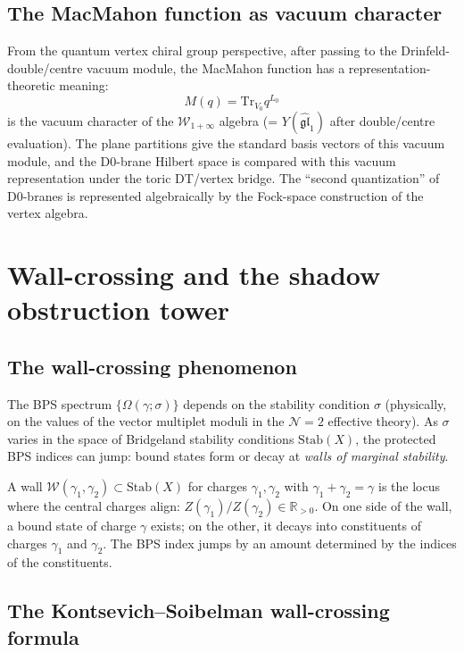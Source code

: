 \documentclass[11pt]{article}
\theoremstyle{definition}
\newcommand{\Tr}{\mathrm{Tr}}
\newcommand{\bR}{\mathbb{R}}
\begin{document}
\subsection{The MacMahon function as vacuum character}

From the quantum vertex chiral group perspective, after passing to the
Drinfeld-double/centre vacuum module, the MacMahon function has a
representation-theoretic meaning:
\[
 M(q) = \Tr_{V_0} q^{L_0}
\]
is the vacuum character of the $\mathcal{W}_{1+\infty}$ algebra (=
$Y(\widehat{\mathfrak{gl}}_1)$ after double/centre evaluation). The
plane partitions give the standard basis vectors of this vacuum module,
and the D0-brane Hilbert space is compared with this vacuum
representation under the toric DT/vertex bridge. The
``second quantization'' of D0-branes is represented algebraically by
the Fock-space construction of the vertex algebra.

\section{Wall-crossing and the shadow obstruction tower}
\label{sec:wall-crossing}

\subsection{The wall-crossing phenomenon}

The BPS spectrum $\{\Omega(\gamma;\sigma)\}$ depends on the stability
condition $\sigma$ (physically, on the values of the vector multiplet
moduli in the $\mathcal{N}=2$ effective theory). As $\sigma$ varies
in the space of Bridgeland stability conditions $\mathrm{Stab}(X)$,
the protected BPS indices can jump: bound states form or decay at
\emph{walls of marginal stability}.

A wall $\mathcal{W}(\gamma_1, \gamma_2) \subset \mathrm{Stab}(X)$
for charges $\gamma_1, \gamma_2$ with $\gamma_1 + \gamma_2 = \gamma$
is the locus where the central charges align: $Z(\gamma_1)/Z(\gamma_2)
\in \bR_{>0}$. On one side of the wall, a bound state of charge
$\gamma$ exists; on the other, it decays into constituents of charges
$\gamma_1$ and $\gamma_2$. The BPS index jumps by an amount
determined by the indices of the constituents.

\subsection{The Kontsevich--Soibelman wall-crossing formula}
\end{document}
